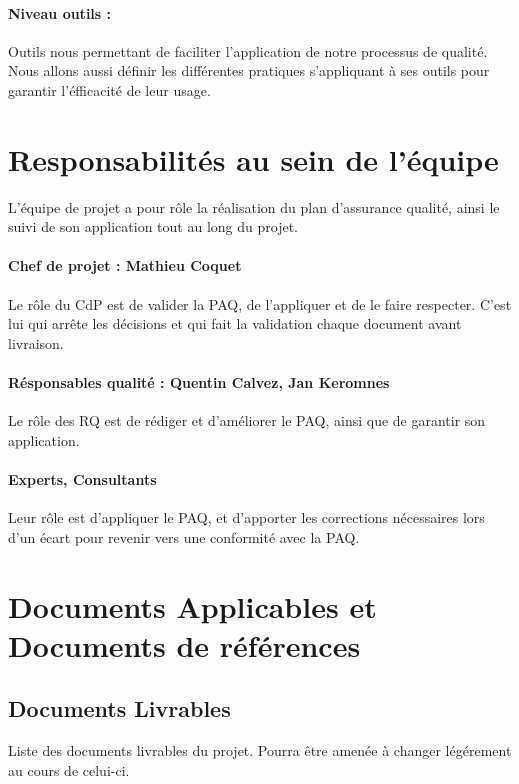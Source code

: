 \documentclass[a4paper, 18pt]{article}
\begin{document}
\paragraph{Niveau outils :} Outils nous permettant de faciliter l'application de notre processus de qualité. Nous allons aussi définir les différentes pratiques s'appliquant à ses outils pour garantir l'éfficacité de leur usage.

\section{Responsabilités au sein de l'équipe}

L'équipe de projet a pour rôle la réalisation du plan d'assurance qualité, ainsi le suivi de son application tout au long du projet.

\paragraph{Chef de projet : Mathieu Coquet} Le rôle du CdP est de valider la PAQ, de l'appliquer et de le faire respecter. C'est lui qui arrête les décisions et qui fait la validation chaque document avant livraison.

\paragraph{Résponsables qualité : Quentin Calvez, Jan Keromnes} Le rôle des RQ est de rédiger et d'améliorer le PAQ, ainsi que de garantir son application.

\paragraph{Experts, Consultants} Leur rôle est d'appliquer le PAQ, et d'apporter les corrections nécessaires lors d'un écart pour revenir vers une conformité avec la PAQ.

\section{Documents Applicables et Documents de références}

\subsection{Documents Livrables}

Liste des documents livrables du projet. Pourra être amenée à changer légérement au cours de celui-ci.
\end{document}
